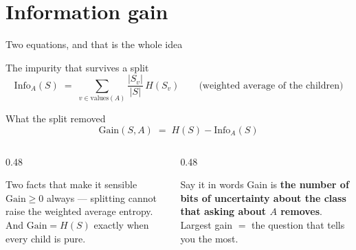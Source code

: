 \documentclass[aspectratio=169]{beamer}
\begin{document}
\section[IG]{Information gain}
\label{sec:gain}

\begin{frame}[shrink=6]{Two equations, and that is the whole idea}
  \begin{exampleblock}{The impurity that survives a split}
    \[
      \mathrm{Info}_A(S) \;=\; \sum_{v \in \mathrm{values}(A)}
        \frac{|S_v|}{|S|}\, H(S_v)
      \qquad\text{(weighted average of the children)}
    \]
  \end{exampleblock}
  \begin{exampleblock}{What the split removed}
    \[
      \mathrm{Gain}(S, A) \;=\; H(S) - \mathrm{Info}_A(S)
    \]
  \end{exampleblock}
  \vspace{0.2em}
  \begin{columns}[T]
    \begin{column}{0.48\textwidth}
      \begin{block}{Two facts that make it sensible}
        \small $\mathrm{Gain} \ge 0$ always --- splitting cannot raise the
        weighted average entropy. And $\mathrm{Gain} = H(S)$ exactly when
        every child is pure.
      \end{block}
    \end{column}
    \begin{column}{0.48\textwidth}
      \begin{alertblock}{Say it in words}
        \small Gain is \textbf{the number of bits of uncertainty about the
        class that asking about $A$ removes}. Largest gain $=$ the question
        that tells you the most.
      \end{alertblock}
    \end{column}
  \end{columns}
\end{frame}
\end{document}

